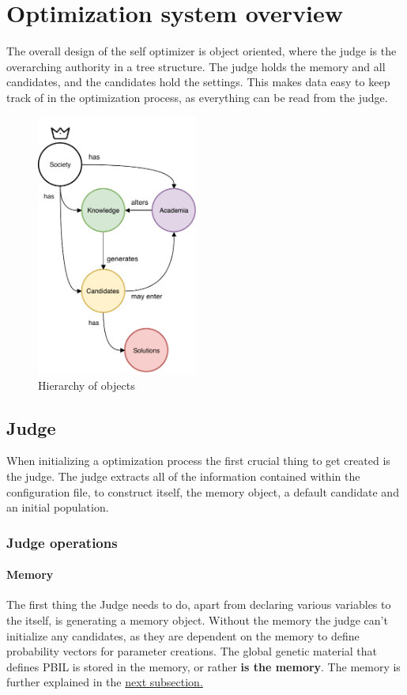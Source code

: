 \documentclass[a4paper,english]{report}
\begin{document}
		\section{Optimization system overview}
		The overall design of the self optimizer is object oriented, where the judge is the overarching authority in a tree structure. The judge holds the memory and all candidates, and the candidates hold the settings. This makes data easy to keep track of in the optimization process, as everything can be read from the judge.
		\begin{figure}[h]
			\centering
			\includegraphics[width=150pt]{OOP}
			\caption{Hierarchy of objects}
		\end{figure}
		\subsection{Judge}
		When initializing a optimization process the first crucial thing to get created is the judge. The judge extracts all of the information contained within the configuration file, to construct itself, the memory object, a default candidate and an initial population.
		\subsubsection{Judge operations}
		\paragraph{Memory}
		The first thing the Judge needs to do, apart from declaring various variables to the itself, is generating a memory object. Without the memory the judge can't initialize any candidates, as they are dependent on the memory to define probability vectors for parameter creations. The global genetic material that defines PBIL is stored in the memory, or rather \textbf{is the memory}. The memory is further explained in the \hyperref[memory]{next subsection.} 
\end{document}
